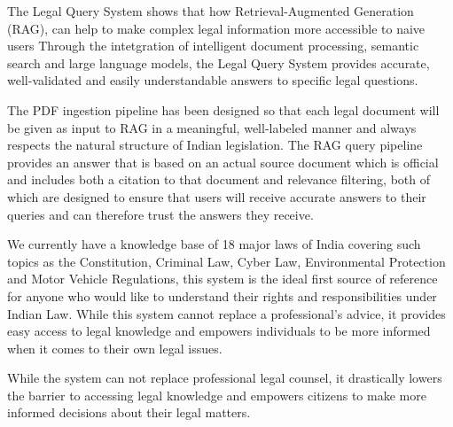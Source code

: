 \documentclass[12pt,a4paper]{article}
\begin{document}
The Legal Query System shows that how Retrieval-Augmented Generation (RAG), can help to make complex legal information more accessible to naive users Through the intetgration of intelligent document processing, semantic search and large language models, the Legal Query System provides accurate, well-validated and easily understandable answers to specific legal questions.

The PDF ingestion pipeline has been designed so that each legal document will be given as input to RAG in a meaningful, well-labeled manner and always respects the natural structure of Indian legislation. The RAG query pipeline provides an answer that is based on an actual source document which is official and includes both a citation to that document and relevance filtering, both of which are designed to ensure that users will receive accurate answers to their queries and can therefore trust the answers they receive.




We currently have a knowledge base of 18 major laws of India covering such topics as the Constitution, Criminal Law, Cyber Law, Environmental Protection and Motor Vehicle Regulations, this system is the ideal first source of reference for anyone who would like to understand their rights and responsibilities under Indian Law. While this system cannot replace a professional's advice, it provides easy access to legal knowledge and empowers individuals to be more informed when it comes to their own legal issues.

While the system can not replace professional legal counsel, it drastically lowers the barrier to accessing legal knowledge and empowers citizens to make more informed decisions about their legal matters.
\vspace{2cm}
\end{document}
